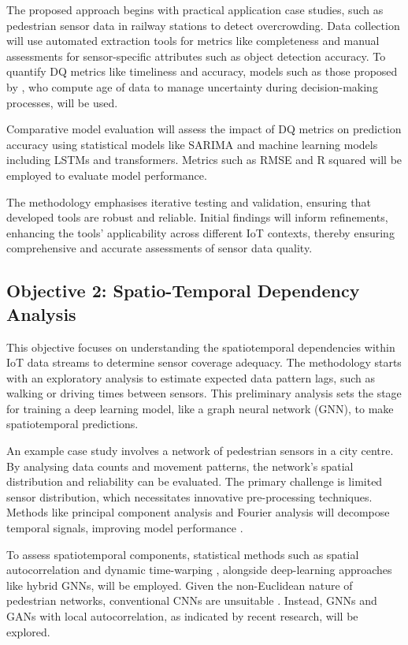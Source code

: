 The proposed approach begins with practical application case studies, such as pedestrian sensor data in railway stations to detect overcrowding. Data collection will use automated extraction tools for metrics like completeness and manual assessments for sensor-specific attributes such as object detection accuracy. To quantify DQ metrics like timeliness and accuracy, models such as those proposed by \cite{fizzaAgeDataAware2022}, who compute age of data to manage uncertainty during decision-making processes, will be used.

Comparative model evaluation will assess the impact of DQ metrics on prediction accuracy using statistical models like SARIMA and machine learning models including LSTMs and transformers. Metrics such as RMSE and R squared will be employed to evaluate model performance.

The methodology emphasises iterative testing and validation, ensuring that developed tools are robust and reliable. Initial findings will inform refinements, enhancing the tools’ applicability across different IoT contexts, thereby ensuring comprehensive and accurate assessments of sensor data quality.

\subsection{Objective 2: Spatio-Temporal Dependency Analysis}

This objective focuses on understanding the spatiotemporal dependencies within IoT data streams to determine sensor coverage adequacy. The methodology starts with an exploratory analysis to estimate expected data pattern lags, such as walking or driving times between sensors. This preliminary analysis sets the stage for training a deep learning model, like a graph neural network (GNN), to make spatiotemporal predictions.

An example case study involves a network of pedestrian sensors in a city centre. By analysing data counts and movement patterns, the network’s spatial distribution and reliability can be evaluated. The primary challenge is limited sensor distribution, which necessitates innovative pre-processing techniques. Methods like principal component analysis and Fourier analysis will decompose temporal signals, improving model performance \citep{kutzDynamicModeDecomposition2016}.

To assess spatiotemporal components, statistical methods such as spatial autocorrelation and dynamic time-warping \cite{froeseComparingTemporalGraphs2020}, alongside deep-learning approaches like hybrid GNNs, will be employed. Given the non-Euclidean nature of pedestrian networks, conventional CNNs are unsuitable \citep{klemmerAugmentingCorrelationStructures2019}. Instead, GNNs and GANs with local autocorrelation, as indicated by recent research, will be explored.


